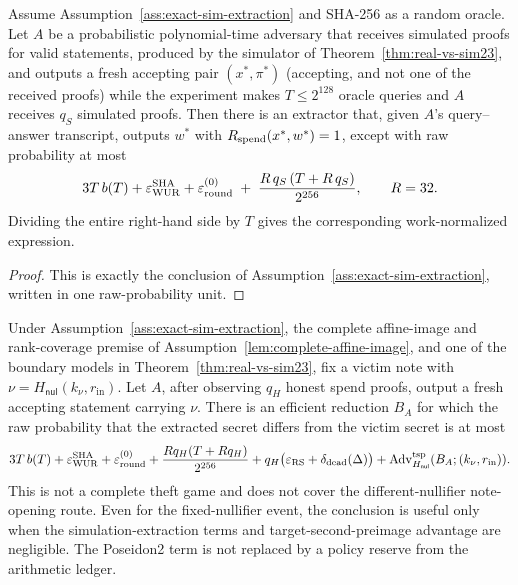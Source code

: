 \begin{theorem}
\label{thm:sim-extractability}
Assume Assumption~\ref{ass:exact-sim-extraction} and SHA-256 as a random
oracle.  Let
\(A\) be a probabilistic polynomial-time adversary that receives simulated
proofs for valid statements, produced by the simulator of
Theorem~\ref{thm:real-vs-sim23}, and outputs a fresh accepting pair
\((x^\ast,\pi^\ast)\) (accepting, and not one of the received proofs) while
the experiment makes \(T\le2^{128}\) oracle queries and \(A\) receives
\(q_S\) simulated proofs.  Then there is an extractor that, given \(A\)'s
query--answer transcript, outputs \(w^\ast\) with
\(R_{\mathrm{spend}}(x^\ast,w^\ast)=1\), except with raw probability at most
\[
 3T\,b(T)
 +\varepsilon_{\rm WUR}^{\rm SHA}+\varepsilon_{\rm round}^{(0)}
 \;+\;
 \frac{R\,q_S\,(T+R\,q_S)}{2^{256}},
 \qquad R=32 .
\]
Dividing the entire right-hand side by \(T\) gives the corresponding
work-normalized expression.
\end{theorem}

\begin{proof}
This is exactly the conclusion of
Assumption~\ref{ass:exact-sim-extraction}, written in one raw-probability unit.
\end{proof}

\begin{corollary}
\label{cor:deployed-theft}
Under Assumption~\ref{ass:exact-sim-extraction}, the complete affine-image and
rank-coverage premise of Assumption~\ref{lem:complete-affine-image}, and one
of the boundary models in Theorem~\ref{thm:real-vs-sim23}, fix a victim note
with \(\nu=H_{\mathsf{nul}}(k_\nu,r_{\mathrm{in}})\).  Let \(A\), after
observing \(q_H\) honest spend proofs, output a fresh accepting statement
carrying \(\nu\).  There is an efficient reduction \(B_A\) for which
the raw probability that the extracted secret differs from the victim secret
is at most
\[
  3T\,b(T)
  +\varepsilon_{\rm WUR}^{\rm SHA}
  +\varepsilon_{\rm round}^{(0)}
  +\frac{Rq_H(T+Rq_H)}{2^{256}}
  +q_H\bigl(\varepsilon_{\rm RS}+\delta_{\rm dead}(\Delta)\bigr)
  +\operatorname{Adv}^{\mathrm{tsp}}_{H_{\mathsf{nul}}}
       (B_A;(k_\nu,r_{\mathrm{in}})).
\]
This is not a complete theft game and does not cover the different-nullifier
note-opening route.  Even for the fixed-nullifier event, the conclusion is
useful only when the simulation-extraction terms and target-second-preimage
advantage are negligible.  The Poseidon2 term is not replaced by a policy
reserve from the arithmetic ledger.
\end{corollary}

